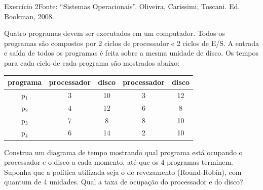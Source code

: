 \begin{frame}{Exercício 2}{Fonte: ``Sistemas Operacionais''. Oliveira,
    Carissimi, Toscani. Ed. Bookman, 2008.}

\small
Quatro programas devem ser executados em um computador. Todos os
programas são compostos por 2 ciclos de processador e 2 ciclos de
E/S. A entrada e saída de todos os programas é feita sobre a mesma
unidade de disco. Os tempos para cada ciclo de cada programa são
mostrados abaixo:

\begin{center}
  \begin{tabular}{ccccc}\hline
    programa & processador & disco & processador & disco \\\hline
    p$_1$ & 3 & 10 & 3 & 12 \\
    p$_2$ & 4 & 12 & 6 & 8 \\
    p$_3$ & 7 & 8 & 8 & 10 \\
    p$_4$ & 6 & 14 & 2 & 10 \\\hline
  \end{tabular}
\end{center}
Construa um diagrama de tempo mostrando qual programa está ocupando o
processador e o disco a cada momento, até que os 4 programas
terminem. Suponha que a política utilizada seja o de revezamento
(Round-Robin), com quantum de 4 unidades. Qual a taxa de ocupação do
processador e do disco?

\end{frame}
